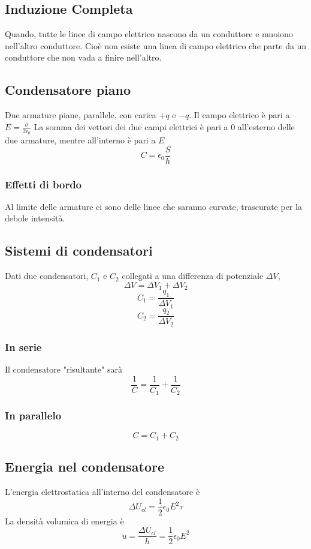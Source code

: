 \documentclass[a4paper]{report}
\begin{document}
  \subsection{Induzione Completa}
  Quando, tutte le linee di campo elettrico nascono da un conduttore e muoiono nell'altro conduttore. Cioè non esiste una linea di campo elettrico che parte da un conduttore che non vada a finire nell'altro.

  \subsection{Condensatore piano}
  Due armature piane, parallele, con carica $+q$ e $-q$.
  Il campo elettrico è pari a \( E = \frac{\sigma}{2\epsilon_0} \)
  La somma dei vettori dei due campi elettrici è pari a $0$ all'esterno delle due armature, mentre all'interno è pari a $E$
  \[ C = \epsilon_0 \frac{S}{h} \]
  \subsubsection{Effetti di bordo}
  Al limite delle armature ci sono delle linee che saranno curvate, trascurate per la debole intensità.
  \subsection{Sistemi di condensatori}
  Dati due condensatori, $C_1$ e $C_2$ collegati a una differenza di potenziale $\Delta V$,
  \[ \Delta V = \Delta V_1 + \Delta V_2 \]
  \[ C_1 = \frac{q_1}{\Delta V_1} \]
  \[ C_2 = \frac{q_2}{\Delta V_2} \]

  \subsubsection{In serie}
  Il condensatore "risultante" sarà
  \[ \frac{1}{C} = \frac{1}{C_1} + \frac{1}{C_2} \]

  \subsubsection{In parallelo}
  \[ C = C_1 + C_2 \]

  \subsection{Energia nel condensatore}
  L'energia elettrostatica all'interno del condensatore è
  \[ \Delta U_{el} = \frac{1}{2} \epsilon_0 E^2 \tau \]
  La densità volumica di energia è
  \[ u = \frac{\Delta U_{el}}{h} = \frac{1}{2} \epsilon_0 E^2 \]
\end{document}
